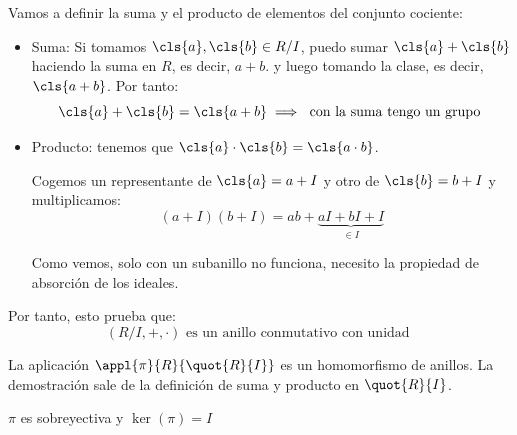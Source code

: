 Vamos a definir la suma y el producto de elementos del conjunto cociente:

\begin{itemize}
	\item Suma: Si tomamos $\cls{a}, \cls{b} \in R/I$, puedo sumar $\cls{a}+\cls{b}$ haciendo la suma en $R$, es decir, $a+b$. y luego tomando la clase, es decir, $\cls{a+b}$. Por tanto:
	$$ \cls{a}+\cls{b} = \cls{a+b} \implies \text{ con la suma tengo un grupo }$$
	\item Producto: tenemos que $ \cls{a}\cdot\cls{b} = \cls{a\cdot b} $.

	Cogemos un representante de $\cls{a}=a+I$ y otro de $\cls{b}=b+I$ y multiplicamos:
	$$ (a+I)(b+I)=ab+\underbrace{aI+bI+I}_{\in I} $$

	Como vemos, solo con un subanillo no funciona, necesito la propiedad de absorción de los ideales.
\end{itemize}

Por tanto, esto prueba que:
$$(R/I,+,\cdot) \text{ es un anillo conmutativo con unidad }$$

\begin{prop}\label{prop:pi_homomorfismo}
	La aplicación $\appl{\pi}{R}{\quot{R}{I}}$ es un homomorfismo de anillos. La demostración sale de la definición de suma y producto en $\quot{R}{I}$.
\end{prop}

\obs $\pi$ es sobreyectiva y $\ker(\pi)=I$

